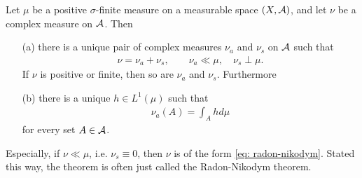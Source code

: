 \documentclass[../../main.tex]{subfiles}
\begin{document}
\begin{theorem}
Let $\mu$ be a positive $\sigma$-finite measure on a measurable space $(X,\mathcal{A})$, and let $\nu$ be a complex measure on $\mathcal{A}$. Then
\begin{itemize}
\item[(a)] there is a unique pair of complex measures $\nu_{a}$ and $\nu_{s}$ on $\mathcal{A}$ such that
\begin{align}
	\nu=\nu_{a}+\nu_{s}, \qquad \nu_{a}\ll \mu, \quad \nu_{s} \perp \mu. \label{eq: lebesgue decomposition}
\end{align}
If $\nu$ is positive or finite, then so are $\nu_{a}$ and $\nu_{s}$. Furthermore
\item[(b)] there is a unique $h\in L^{1}(\mu)$ such that
\begin{align}
	\nu_{a}(A)=\int_{A}h d\mu \label{eq: radon-nikodym}
\end{align}
for every set $A\in \mathcal{A}$.
\end{itemize}
Especially, if $\nu\ll \mu$, i.e. $\nu_{s}\equiv 0$, then $\nu$ is of the form \eqref{eq: radon-nikodym}. Stated this way, the theorem is often just called the Radon-Nikodym theorem.
\end{theorem}
\end{document}
